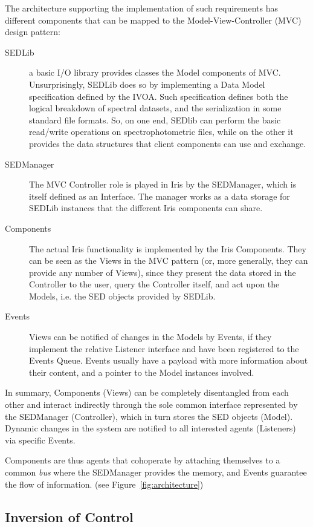 \documentclass[final,5p]{elsarticle}
\begin{document}
The architecture supporting the implementation of such requirements has different components that can be mapped to the Model-View-Controller (MVC) design pattern:
\begin{description}
\item[SEDLib] a basic I/O library provides classes the Model components of MVC. Unsurprisingly, SEDLib does so by implementing a Data Model specification defined by the IVOA. Such specification defines both the logical breakdown of spectral datasets, and the serialization in some standard file formats. So, on one end, SEDlib can perform the basic read/write operations on spectrophotometric files, while on the other it provides the data structures that client components can use and exchange.
\item[SEDManager] The MVC Controller role is played in Iris by the SEDManager, which is itself defined as an Interface. The manager works as a data storage for SEDLib instances that the different Iris components can share.
\item[Components] The actual Iris functionality is implemented by the Iris Components. They can be seen as the Views in the MVC pattern (or, more generally, they can provide any number of Views), since they present the data stored in the Controller to the user, query the Controller itself, and act upon the Models, i.e. the SED objects provided by SEDLib.
\item[Events] Views can be notified of changes in the Models by Events, if they implement the relative Listener interface and have been registered to the Events Queue. Events usually have a payload with more information about their content, and a pointer to the Model instances involved.
\end{description}

In summary, Components (Views) can be completely disentangled from each other and interact indirectly through the sole common interface represented by the SEDManager (Controller), which in turn stores the SED objects (Model). Dynamic changes in the system are notified to all interested agents (Listeners) via specific Events.

Components are thus agents that cohoperate by attaching themselves to a common \emph{bus} where the SEDManager provides the memory, and Events guarantee the flow of information. (see Figure~\ref{fig:architecture})

\subsection{Inversion of Control}
\end{document}
